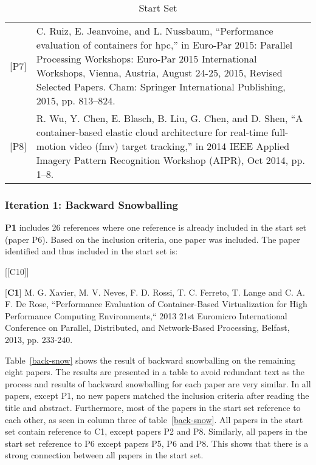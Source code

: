 \begin{table}[ht]
\begin{tabular}{lp{13cm}}
{[}P7{]}  & C. Ruiz, E. Jeanvoine, and L. Nussbaum, “Performance evaluation of containers for hpc,” in Euro-Par 2015: Parallel Processing Workshops: Euro-Par 2015 International Workshops, Vienna, Austria, August 24-25, 2015, Revised Selected Papers. Cham: Springer International Publishing, 2015, pp. 813–824. \\
{[}P8{]}  & R. Wu, Y. Chen, E. Blasch, B. Liu, G. Chen, and D. Shen, “A container-based elastic cloud architecture for real-time full-motion video (fmv) target tracking,” in 2014 IEEE Applied Imagery Pattern Recognition Workshop (AIPR), Oct 2014, pp. 1–8. 
\end{tabular}
\centering
\caption{Start Set}
\label{lr-startset}
\end{table}
\subsubsection*{Iteration 1: Backward Snowballing}
\textbf{P1} includes 26 references where one reference is already included in the start set (paper P6). Based on the inclusion criteria, one paper was included. The paper identified and thus included in the start set is: \\

\begin{labeling}{[{[}C10{]}]}
\item [{[}\textbf{C1}{]}]  M. G. Xavier, M. V. Neves, F. D. Rossi, T. C. Ferreto, T. Lange and C. A. F. De Rose, “Performance Evaluation of Container-Based Virtualization for High Performance Computing Environments,“ 2013 21st Euromicro International Conference on Parallel, Distributed, and Network-Based Processing, Belfast, 2013, pp. 233-240.
\item
\end{labeling}

Table~\ref{back-snow} shows the result of backward snowballing on the remaining eight papers. The results are presented in a table to avoid redundant text as the process and results of backward snowballing for each paper are very similar. In all papers, except P1, no new papers matched the inclusion criteria after reading the title and abstract. Furthermore, most of the papers in the start set reference to each other, as seen in column three of table~\ref{back-snow}. All papers in the start set contain reference to C1, except papers P2 and P8. Similarly, all papers in the start set reference to P6 except papers P5, P6 and P8. This shows that there is a strong connection between all papers in the start set. 

